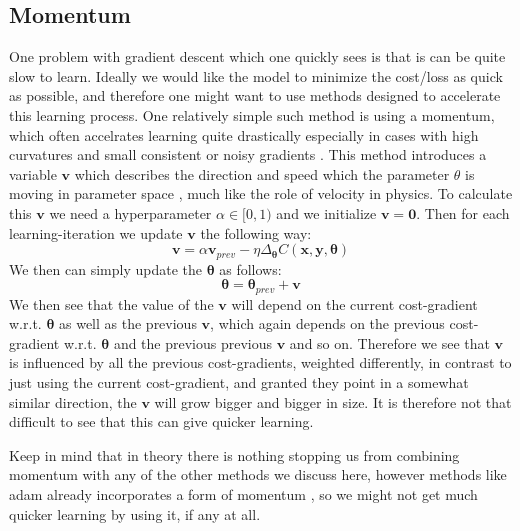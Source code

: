 \documentclass{article}
\begin{document}
\subsection{Momentum}
One problem with gradient descent which one quickly sees is that is can be quite
slow to learn. Ideally we would like the model to minimize the cost/loss as
quick as possible, and therefore one might want to use methods designed to
accelerate this learning process. One relatively simple such method is using a
momentum, which often accelrates learning quite drastically especially in cases
with high curvatures and small consistent or noisy gradients
\cite[s.~8.3.2]{goodfellow2016deep}. This method introduces a variable $\bm{v}$
which describes the direction and speed which the parameter $\theta$ is moving
in parameter space \cite[s.~8.3.2]{goodfellow2016deep}, much like the role of
velocity in physics. To calculate this $\bm{v}$ we need a hyperparameter $\alpha
      \in [0, 1)$ and we initialize $\bm{v} = \bm{0}$. Then for each
learning-iteration we update $\bm{v}$ the following way:
$$\bm{v} = \alpha \bm{v}_{prev} - \eta \Delta_{\bm{\theta}} C(\bm{x}, \bm{y}, \bm{\theta})$$
We then can simply update the $\bm{\theta}$ as follows:
$$\bm{\theta} = \bm{\theta}_{prev} + \bm{v}$$
We then see that the value of the $\bm{v}$ will depend on the current cost-gradient
w.r.t. $\bm{\theta}$ as well as the previous $\bm{v}$, which again depends on
the previous cost-gradient w.r.t. $\bm{\theta}$ and the previous previous
$\bm{v}$ and so on. Therefore we see that $\bm{v}$ is influenced by all the
previous cost-gradients, weighted differently, in contrast to just using the
current cost-gradient, and granted they point in a somewhat similar direction,
the $\bm{v}$ will grow bigger and bigger in size. It is therefore not that
difficult to see that this can give quicker learning.


Keep in mind that in theory there is nothing stopping us from combining momentum
with any of the other methods we discuss here, however methods like adam already
incorporates a form of momentum \cite[s.~8.5.3]{goodfellow2016deep}, so we might
not get much quicker learning by using it, if any at all.
\end{document}
